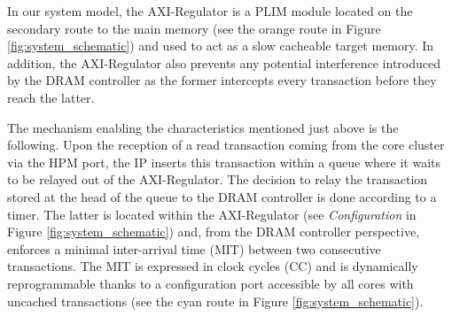 %

    In our system model, the AXI-Regulator is a PLIM module \cite{PLIM20} located on the secondary route to the main memory (see the orange route in Figure \ref{fig:system_schematic}) and used to act as a slow cacheable target memory.
    In addition, the AXI-Regulator also prevents any potential interference introduced by the DRAM controller as the former intercepts every transaction before they reach the latter.

    The mechanism enabling the characteristics mentioned just above is the following.
    Upon the reception of a read transaction coming from the core cluster via the HPM port, the IP inserts this transaction within a queue where it waits to be relayed out of the AXI-Regulator.
    The decision to relay the transaction stored at the head of the queue to the DRAM controller is done according to a timer.
    The latter is located within the AXI-Regulator (see \emph{Configuration} in Figure \ref{fig:system_schematic}) and, from the DRAM controller perspective, enforces a minimal inter-arrival time (MIT) between two consecutive transactions.
    The MIT is expressed in clock cycles (CC) and is dynamically reprogrammable thanks to a configuration port accessible by all cores with uncached transactions (see the cyan route in Figure \ref{fig:system_schematic}).
